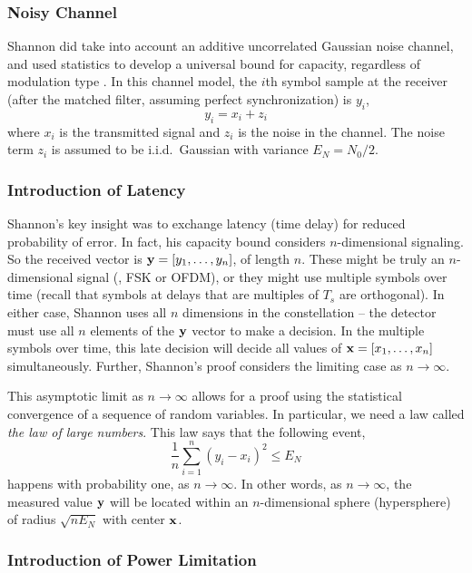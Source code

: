 \subsubsection{Noisy Channel}

Shannon did take into account an additive uncorrelated Gaussian noise channel, and used statistics to develop a universal bound for capacity, regardless of modulation type \cite{shannon1948mathematical}.  In this channel model, the $i$th symbol sample at the receiver (after the matched filter, assuming perfect synchronization) is $y_i$,
\[
  y_i = x_i + z_i
\]
where $x_i$ is the transmitted signal and $z_i$ is the noise in the
channel.  The noise term $z_i$ is assumed to be i.i.d.~Gaussian with
variance $E_N = N_0/2$.

\subsubsection{Introduction of Latency}

Shannon's key insight was to exchange latency (time delay) for reduced probability of error.  In fact, his capacity bound considers $n$-dimensional signaling.  So the received vector is $\mathbf{y} = [y_1, \ldots, y_n]$, of length $n$.  These might be truly an $n$-dimensional signal (\eg, FSK or OFDM), or they might use multiple symbols over time (recall that symbols at delays that are multiples of $T_s$ are orthogonal). In either case, Shannon uses all $n$ dimensions in the constellation -- the detector must use all $n$ elements of the $\mathbf{y}$ vector to make a decision. In the multiple symbols over time, this late decision will decide all values of $\mathbf{x} = [x_1, \ldots, x_n]$ simultaneously. Further, Shannon's proof considers the limiting case as $n\rightarrow \infty$.

This asymptotic limit as $n\rightarrow \infty$ allows for a proof using the statistical convergence of a sequence of random variables. In particular, we need a law called \emph{the law of large numbers}.  
This law says that the following event,
\[
  \frac{1}{n} \sum_{i=1}^n (y_i - x_i)^2 \le E_N
\]
happens with probability one, as $n\rightarrow \infty$.  In other words, as $n\rightarrow \infty$, the measured value $\mathbf{y}$ will be located within an $n$-dimensional sphere (hypersphere) of radius $\sqrt{n E_N}$ with center $\mathbf{x}$.

\subsubsection{Introduction of Power Limitation}

